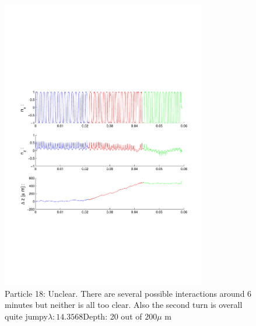 \begin{figure}[ H]

\caption{Particle 18: Unclear. There are several possible interactions around 6 minutes but neither is all too clear. Also the second turn is overall quite jumpy$ \lambda: 14.3568$Depth: 20 out of $200 \mu $ m}

\centering

\includegraphics[width=0.8\textwidth]{Images/Particle 18/Particle18.pdf}

\end{figure}

